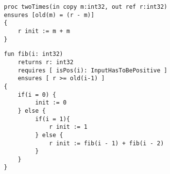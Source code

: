\begin{lstlisting}[caption=Pre-/postconditions mit old Funktion und Zugriff auf out Parameter]
proc twoTimes(in copy m:int32, out ref r:int32)
ensures [old(m) = (r - m)]
{
    r init := m + m
}
\end{lstlisting}

\begin{lstlisting}[caption=Pre-/postconditions mit old Funktion und Zugriff auf Return Wert]
fun fib(i: int32)
    returns r: int32
    requires [ isPos(i): InputHasToBePositive ]
    ensures [ r >= old(i-1) ]
{
    if(i = 0) {
         init := 0
    } else {
         if(i = 1){
             r init := 1
         } else {
             r init := fib(i - 1) + fib(i - 2)
         }
    }
}
\end{lstlisting}
